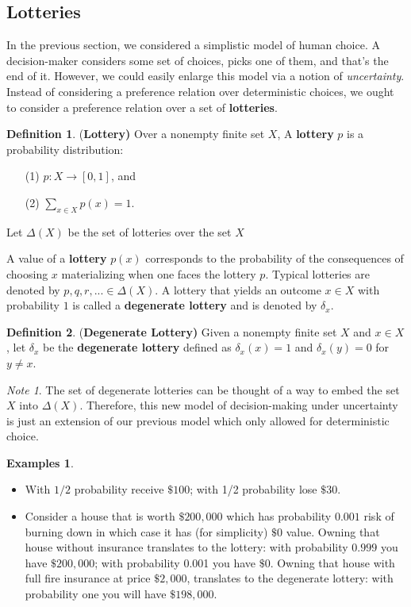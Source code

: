 \documentclass[12pt]{article}
\theoremstyle{plain}
\theoremstyle{definition}
\newtheorem{defin}{Definition}[subsection]
\newtheorem{unex}[ex]{Examples}
\theoremstyle{remark}
\newtheorem*{note}{Note}
\newcommand{\tn}[1]{\textnormal{#1}}
\newcommand{\3}{\vspace*{3mm}}
\newcommand{\name}[1]{\tn{(\textbf{#1)}}}
\begin{document}
\subsection{Lotteries}

In the previous section, we considered a simplistic model of human choice. A decision-maker considers some set of choices, picks one of them, and that's the end of it. However, we could easily enlarge this model via a notion of \emph{uncertainty}. Instead of considering a preference relation over deterministic choices, we ought to consider a preference relation over a set of \textbf{lotteries}.

\begin{defin} \name{Lottery}
Over a nonempty finite set $X$, A \textbf{lottery} $p$ is a probability distribution:
\begin{itemize}
\item[(1)] $p: X \to [0,1]$, and
\item[(2)] $\sum_{x \in X} p(x) = 1$.
 
\end{itemize}

Let $\Delta(X)$ be the set of lotteries over the set $X$
\end{defin}

A value of a \textbf{lottery} $p(x)$ corresponds to the probability of the consequences of choosing $x$ materializing when one faces the lottery $p$. Typical lotteries are denoted by $p, q, r, . . . \in \Delta(X)$. A lottery that yields an outcome $x \in X$ with probability $1$ is called a \textbf{degenerate lottery} and is denoted by $\delta_x$.

\begin{defin} \name{Degenerate Lottery}
Given a nonempty finite set $X$ and $x \in X$, let $\delta_x$ be the \textbf{degenerate lottery} defined as $\delta_x(x) = 1$ and $\delta_x(y) = 0$ for $y \neq x$.

\end{defin}

\begin{note}
The set of degenerate lotteries can be thought of a way to embed the set $X$ into $\Delta(X)$. Therefore, this new model of decision-making under uncertainty is just an extension of our previous model which only allowed for deterministic choice.  
\end{note}
\newpage
\begin{unex}
\
\begin{itemize}
\item With $1/2$ probability receive $\$100$; with 1/2 probability lose $\$30$. \item Consider a house that is worth $\$200,000$ which has probability $0.001$ risk of burning down in which case it has (for simplicity) $\$0$ value. Owning that house without insurance translates to the lottery: with probability $0.999$ you have $\$200,000$; with probability 0.001 you have $\$0$. Owning that house with full fire insurance at price $\$2,000$, translates to the degenerate lottery: with probability one you will have $\$198,000$.



\end{itemize}
\end{unex}
\end{document}
